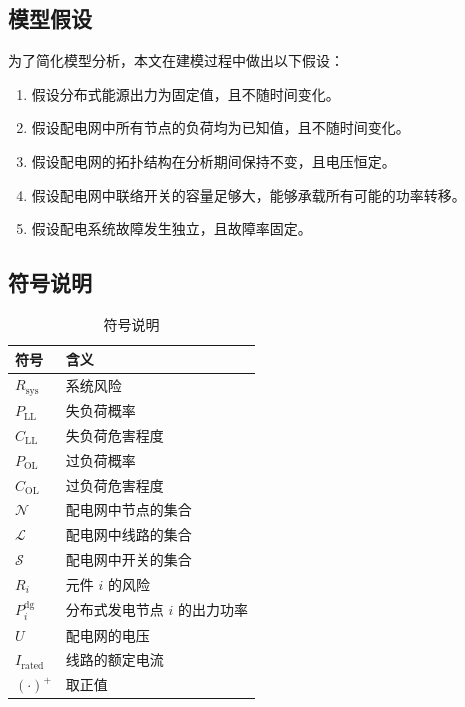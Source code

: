 \documentclass{article}
\begin{document}
\subsection{模型假设}\label{subsec:assumption}

为了简化模型分析，本文在建模过程中做出以下假设：

\begin{enumerate}
  \item 假设分布式能源出力为固定值，且不随时间变化。\label{assumption:fixed_output}
  \item 假设配电网中所有节点的负荷均为已知值，且不随时间变化。\label{assumption:fixed_load}
  \item 假设配电网的拓扑结构在分析期间保持不变，且电压恒定。\label{assumption:topology_fixed}
  \item 假设配电网中联络开关的容量足够大，能够承载所有可能的功率转移。\label{assumption:large_capacity}
  \item 假设配电系统故障发生独立，且故障率固定。\label{assumption:independent_failure}
\end{enumerate}

\subsection{符号说明}\label{subsec:notation}

\begin{table}[H]
  \centering
  \begin{tabular}{>{\centering\arraybackslash}p{}>{\centering\arraybackslash}p{}}
    \toprule
    符号 & 含义 \\
    \midrule
    $R_{\text{sys}}$ & 系统风险 \\
    $P_{\text{LL}}$ & 失负荷概率 \\
    $C_{\text{LL}}$ & 失负荷危害程度 \\
    $P_{\text{OL}}$ & 过负荷概率 \\
    $C_{\text{OL}}$ & 过负荷危害程度 \\
    $\mathcal{N}$ & 配电网中节点的集合 \\
    $\mathcal{L}$ & 配电网中线路的集合 \\
    $\mathcal{S}$ & 配电网中开关的集合 \\
    $R_i$ & 元件 $i$ 的风险 \\
    $P_i^{\text{dg}}$ & 分布式发电节点 $i$ 的出力功率 \\
    $U$ & 配电网的电压 \\
    $I_{\text{rated}}$ & 线路的额定电流 \\
    $(\cdot)^+$ & 取正值 \\
    \bottomrule
  \end{tabular}
  \caption{符号说明}
  \label{tab:notation}
\end{table}
\end{document}
